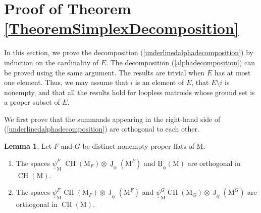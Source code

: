 \documentclass[11pt,reqno]{amsart}
\theoremstyle{definition}
\newtheorem{lemma}[theorem]{Lemma}
\theoremstyle{remark}
\renewcommand{\(}{\left(}
\renewcommand{\)}{\right)}
\newcommand{\<}{\left<}
\renewcommand{\>}{\right>}
\newcommand{\uJ}{\underline{\operatorname{J}}}
\newcommand{\CH}{\operatorname{CH}}
\newcommand{\uCH}{\underline{\CH}}
\begin{document}

\section{Proof of Theorem \ref{TheoremSimplexDecomposition}}\label{Section5}

In this section, we prove the decomposition (\ref{underlinedalphadecomposition}) by induction on the cardinality of $E$.
The decomposition (\ref{alphadecomposition}) can be proved using the same argument. 
The results are trivial when $E$ has at most one element.
Thus, we may assume that $i$ is an element of $E$, that $E \setminus i$ is nonempty, and that all the results hold for loopless matroids whose ground set is a proper subset of $E$.

We first prove that the summands appearing in the right-hand side of  (\ref{underlinedalphadecomposition})  are orthogonal to each other. 

\begin{lemma}
Let $F$ and $G$ be distinct nonempty proper flats of $\mathrm{M}$.
\begin{enumerate}[(1)]\itemsep 5pt
\item The spaces  $\underline\psi^F_\mathrm{M}\ \uCH(\mathrm{M}_F)\otimes \uJ_{\underline{\alpha}}(\mathrm{M}^F)$ and $\underline{\mathrm{H}}_{\underline{\alpha}}(\mathrm{M})$  are orthogonal in $\underline{\CH}(\mathrm{M})$.
\item The spaces
$\underline{\psi}^F_\mathrm{M} \uCH(\mathrm{M}_F)\otimes \uJ_{\underline{\alpha}}(\mathrm{M}^F)$ and $\underline{\psi}^G_\mathrm{M} \uCH(\mathrm{M}_G)\otimes \uJ_{\underline{\alpha}}(\mathrm{M}^G)$ are orthogonal in $\underline{\CH}(\mathrm{M})$.
\end{enumerate}
\end{lemma}
\end{document}
